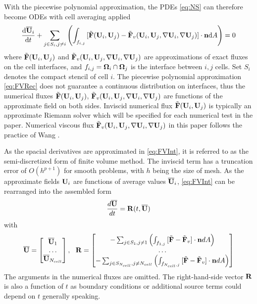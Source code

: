 \documentclass[preprint,12pt]{elsarticle}
\begin{document}
With the piecewise polynomial approximation,
the PDEs \eqref{eq:NS} can therefore become ODEs
with cell averaging applied
\begin{equation}
    \label{eq:FVInt}
    \frac{\dd\overline{\mathbf{U}}_i}{\dd t}
    +\sum_{j\in S_i, j\neq i}{\left(
        \int_{f_{i,j}}{
            [\tilde{\mathbf{F}}(\mathbf{U}_i,\mathbf{U}_j) - \tilde{\mathbf{F}}_v(\mathbf{U}_i,\mathbf{U}_j, \nabla \mathbf{U}_i, \nabla \mathbf{U}_j)] \cdot \mathbf{n}  \dd A
        }\right)
    }
    = 0
\end{equation}
where $\tilde{\mathbf{F}}(\mathbf{U}_i,\mathbf{U}_j)$ and $\tilde{\mathbf{F}}_v(\mathbf{U}_i,\mathbf{U}_j, \nabla \mathbf{U}_i, \nabla \mathbf{U}_j)$ are approximations
of exact fluxes on the cell interfaces,
and $f_{i,j}=\mathbf{\Omega}_i \cap \mathbf{\Omega}_j$ is the interface between $i,j$ cells.
Set $S_i$ denotes the compact stencil of cell $i$.
The piecewise polynomial approximation \eqref{eq:FVRec} does not
guarantee a continuous distribution on interfaces,
thus the numerical fluxes
$\tilde{\mathbf{F}}(\mathbf{U}_i,\mathbf{U}_j)$, $\tilde{\mathbf{F}}_v(\mathbf{U}_i,\mathbf{U}_j, \nabla \mathbf{U}_i, \nabla \mathbf{U}_j)$ are
functions of the approximate field on both sides. Inviscid numerical
flux $\tilde{\mathbf{F}}(\mathbf{U}_i,\mathbf{U}_j)$ is typically an approximate Riemann solver which
will be specified for each numerical test in the paper.
Numerical viscous flux $\tilde{\mathbf{F}}_v(\mathbf{U}_i,\mathbf{U}_j, \nabla \mathbf{U}_i, \nabla \mathbf{U}_j)$
in this paper follows the practice of Wang \cite{wang2017compact_VR}.

As the spacial derivatives are approximated in \eqref{eq:FVInt},
it is referred to as the semi-discretized form of finite volume method.
The inviscid term has a truncation error of $O(h^{p+1})$ for smooth problems,
with $h$ being the size of mesh. As the approximate fields $\mathbf{U}_i$ are functions
of average values $\overline{\mathbf{U}}_i$, \eqref{eq:FVInt} can be rearranged into the
assembled form
\begin{equation}
    \label{eq:FVODE}
    \frac{d\overline{\mathbf{U}}}{dt} = \mathbf{R}(t, \overline{\mathbf{U}})
\end{equation}
with
\begin{equation}
    \overline{\mathbf{U}} = \begin{bmatrix}
        \overline{\mathbf{U}}_1 \\
        \dots \\
        \overline{\mathbf{U}}_{N_{cell}}
    \end{bmatrix},\ \
    \mathbf{R} = \begin{bmatrix}
        -\sum_{j\in S_1, j\neq 1}{\left(
            \int_{f_{1,j}}{
                [\tilde{\mathbf{F}} - \tilde{\mathbf{F}}_v] \cdot \mathbf{n}  dA
            }\right)
        }     \\
        \dots \\
        -\sum_{j\in S_{N_{cell}}, j\neq N_{cell}}{\left(
            \int_{f_{N_{cell},j}}{
                [\tilde{\mathbf{F}} - \tilde{\mathbf{F}}_v] \cdot \mathbf{n}  dA
            }\right)
        }
    \end{bmatrix}
\end{equation}
The arguments in the numerical fluxes are omitted.
The right-hand-side vector $\mathbf{R}$ is also a function of $t$
as boundary conditions or additional source terms
could depend on $t$ generally speaking.
\end{document}
